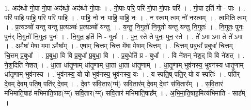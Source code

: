 \documentclass[17pt]{extarticle}
\begin{document}
1. अद॑ब्धो गो॒पा गो॒पा अद॑ब्धो॒ अद॑ब्धो गो॒पाः । . गो॒पाः परि॒ परि॑ गो॒पा गो॒पाः परि॑ । . गो॒पा इति॑ गो - पाः । . परि॑ पाहि पाहि॒ परि॒ परि॑ पाहि । . पा॒हि॒ नो॒ नः॒ पा॒हि॒ पा॒हि॒ नः॒ । . न॒ स्त्वम् त्वम् नो॑ न॒स्त्वम् । . त्वमिति॒ त्वम् । . प्र॒त्यञ्चो॑ यन्तु यन्तु प्र॒त्यञ्चः॑ प्र॒त्यञ्चो॑ यन्तु । . य॒न्तु॒ नि॒गुतो॑ नि॒गुतो॑ यन्तु यन्तु नि॒गुतः॑ । . नि॒गुतः॒ पुनः॒ पुन॑र् नि॒गुतो॑ नि॒गुतः॒ पुनः॑ । . नि॒गुत॒ इति॑ नि - गुतः॑ । . पुन॒ स्ते ते पुनः॒ पुन॒ स्ते । . ते॑ ऽमा ऽमा ते ते॑ ऽमा । . अ॒मैषा॑ मेषा म॒मा ऽमैषा᳚म् । . ए॒षा॒म् चि॒त्तम् चि॒त्त मे॑षा मेषाम् चि॒त्तम् । . चि॒त्तम् प्र॒बुधा᳚ प्र॒बुधा॑ चि॒त्तम् चि॒त्तम् प्र॒बुधा᳚ । . प्र॒बुधा॒ वि वि प्र॒बुधा᳚ प्र॒बुधा॒ वि । . प्र॒बुधेति॑ प्र - बुधा᳚ । . वि ने॑शन् नेश॒द् वि वि ने॑शत् । . ने॒श॒दिति॑ नेशत् । . धा॒ता धा॑तृ॒णाम् धा॑तृ॒णाम् धा॒ता धा॒ता धा॑तृ॒णाम् । . धा॒तृ॒णाम् भुव॑नस्य॒ भुव॑नस्य धातृ॒णाम् धा॑तृ॒णाम् भुव॑नस्य । . भुव॑नस्य॒ यो यो भुव॑नस्य॒ भुव॑नस्य॒ यः । . य स्पति॒ष् पति॒र् यो य स्पतिः॑ । . पति॑र् दे॒वम् दे॒वम् पति॒ष् पति॑र् दे॒वम् । . दे॒वꣳ स॑वि॒तार(ग्म्॑) सवि॒तार॑म् दे॒वम् दे॒वꣳ स॑वि॒तार᳚म् । . स॒वि॒तार॑ मभिमाति॒षाह॑ मभिमाति॒षाह(ग्म्॑) सवि॒तार(ग्म्॑) सवि॒तार॑ मभिमाति॒षाह᳚म् । . अ॒भि॒मा॒ति॒षाह॒मित्य॑भिमाति - साह᳚म् । \newline
\end{document}
